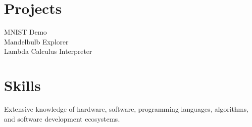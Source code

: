 \documentclass{res}
\begin{document}
\section{Projects}
MNIST Demo \\
Mandelbulb Explorer \\
Lambda Calculus Interpreter


\section{Skills}
Extensive knowledge of hardware, software, programming languages, algorithms, and software development ecosystems.
\end{document}
